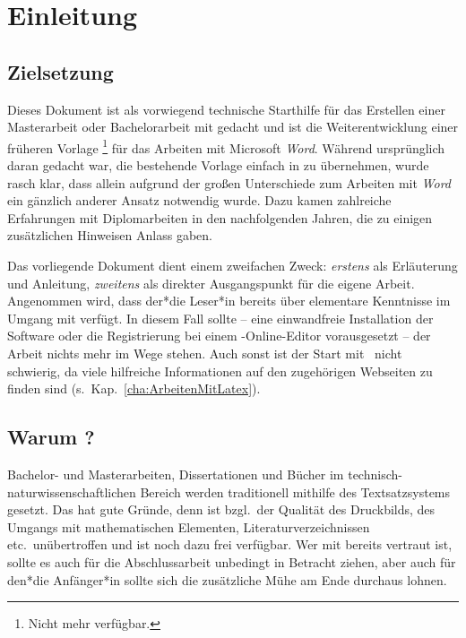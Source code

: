\chapter{Einleitung}
\label{cha:Einleitung}


\section{Zielsetzung}

Dieses Dokument ist als vorwiegend technische Starthilfe für das Erstellen
einer Masterarbeit oder Bachelorarbeit mit \latex gedacht und ist die
Weiterentwicklung einer früheren Vorlage%
\footnote{Nicht mehr verfügbar.}
für das Arbeiten mit Microsoft \emph{Word}. Während ursprünglich daran
gedacht war, die bestehende Vorlage einfach in \latex zu übernehmen, wurde
rasch klar, dass allein aufgrund der großen Unterschiede zum Arbeiten mit
\emph{Word} ein gänzlich anderer Ansatz notwendig wurde. Dazu kamen
zahlreiche Erfahrungen mit Diplomarbeiten in den nachfolgenden Jahren, die zu
einigen zusätzlichen Hinweisen Anlass gaben.

Das vorliegende Dokument dient einem zweifachen Zweck: \emph{erstens} als
Erläuterung und Anleitung, \emph{zweitens} als direkter Ausgangspunkt für die
eigene Arbeit. Angenommen wird, dass der*die Leser*in bereits über elementare
Kenntnisse im Umgang mit \latex verfügt. In diesem Fall sollte -- eine
einwandfreie Installation der Software oder die Registrierung bei einem
\latex-Online-Editor vorausgesetzt -- der Arbeit nichts mehr im Wege stehen.
Auch sonst ist der Start mit \latex\ nicht schwierig, da viele hilfreiche
Informationen auf den zugehörigen Webseiten zu finden sind
(s.\ Kap.~\ref{cha:ArbeitenMitLatex}).


\section{Warum {\latex}?}

Bachelor- und Masterarbeiten, Dissertationen und Bücher im technisch-%
natur\-wissen\-schaft\-lichen Bereich werden traditionell mithilfe
des Textsatzsystems \latex \cite{Lamport1994, Lamport1995} gesetzt.
Das hat gute Gründe, denn \latex ist bzgl.\ der Qualität des Druckbilds, des
Umgangs mit mathematischen Elementen, Literaturverzeichnissen etc.\
unübertroffen und ist noch dazu frei verfügbar. Wer mit \latex bereits
vertraut ist, sollte es auch für die Abschlussarbeit unbedingt in Betracht
ziehen, aber auch für den*die Anfänger*in sollte sich die zusätzliche Mühe am
Ende durchaus lohnen.


